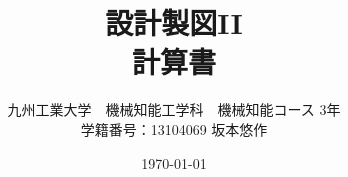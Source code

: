 \pagestyle{plain}
\title{設計製図I\hspace{-.1em}I \\計算書}
\author{九州工業大学　機械知能工学科　機械知能コース 3年\\学籍番号：13104069 坂本悠作}
\date{\today}